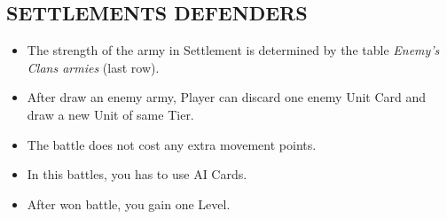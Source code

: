 \begin{multicols}{2}
\subsection*{\MakeUppercase{Settlements defenders}}
\begin{itemize}
  \item The strength of the army in Settlement is determined by the table \textit{Enemy's Clans armies} (last row).
  \item After draw an enemy army, Player can discard one enemy Unit Card and draw a new Unit of same Tier.
  \item The battle does not cost any extra movement points.
  \item In this battles, you has to use AI Cards.
  \item After won battle, you gain one Level.
\end{itemize}

\columnbreak

\vspace*{\fill}

\end{multicols}

\vspace{2em}

